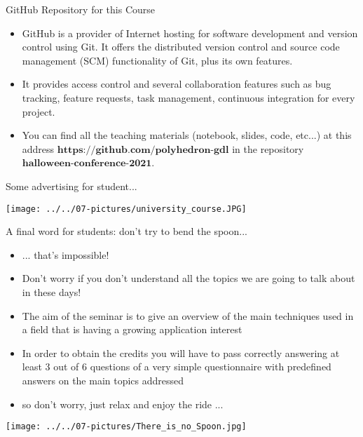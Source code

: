 \documentclass[11pt]{beamer}
\newcommand{\highlight}[1]{%
  \colorbox{yellow!100}{$\displaystyle#1$}}
\begin{document}
%
%
\begin{frame}{GitHub Repository for this Course}
\begin{itemize}
\item GitHub is a provider of Internet hosting for software development and version control using Git. It offers the distributed version control and source code management (SCM) functionality of Git, plus its own features. 
\item It provides access control and several collaboration features such as bug tracking, feature requests, task management, continuous integration for every project. 
\item You can find all the teaching materials (notebook, slides, code, etc...) at this address
\highlight{\textbf{https://github.com/polyhedron-gdl}} in the repository \highlight{\textbf{halloween-conference-2021}}.  
\end{itemize}
\end{frame}
\begin{frame}{Some advertising for student...}
\begin{center}
\texttt{[image: ../../07-pictures/university\_course.JPG]} 
\end{center}
\end{frame}
\begin{frame}{A final word for students: don't try to bend the spoon...}
\begin{itemize}
\item ... that's impossible!
\item Don't worry if you don't understand all the topics we are going to talk about in these days!
\item The aim of the seminar is to give an overview of the main techniques used in a field that is having a growing application interest
\item In order to obtain the credits you will have to pass correctly answering at least 3 out of 6 questions of a very simple questionnaire with predefined answers on the main topics addressed
\item so don't worry, just relax and enjoy the ride ...
\end{itemize}
\begin{center}
\texttt{[image: ../../07-pictures/There\_is\_no\_Spoon.jpg]} 
\end{center}
\end{frame}
%
\end{document}
